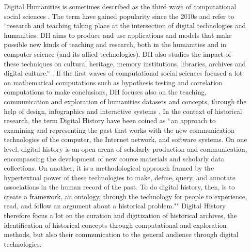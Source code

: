 Digital Humanities is sometimes described as the third wave of computational social sciences \cite{lemercierQuantitativeMethodsHumanities2019}.
The term have gained popularity since the 2010s and refer to ``research and teaching taking place at the intersection of digital technologies and humanities. DH aims to
produce and use applications and models that make possible new kinds of teaching and research, both in the humanities and
in computer science (and its allied technologies). DH also studies the impact of these techniques on cultural heritage,
memory institutions, libraries, archives and digital culture.'' \cite{terras2011quantifying}.
If the first waves of computational social sciences focused a lot on mathematical computations such as hypothesis testing and correlation computations to make conclusions, DH focuses also on the teaching, communication and exploration of humanities datasets and concepts, through the help of design, infographics and interactive systems \cite{burdickDigitalHumanities2016}.
In the context of historical research, the term Digital History have been coined as ``an approach to examining and representing the past that works with the new communication technologies of the computer, the Internet network, and software systems. On one level, digital history is an open arena of scholarly production and communication, encompassing the development of new course materials and scholarly data collections. On another, it is a methodological approach framed by the hypertextual power of these technologies to make, define, query, and annotate associations in the human record of the past. To do digital history, then, is to create a framework, an ontology, through the technology for people to experience, read, and follow an argument about a historical problem."" \cite{InterchangePromiseDigital2008}
Digital History therefore focus a lot on the curation and digitization of historical archives, the identification of historical concepts through computational and exploration methods, but also their communication to the general audience through digital technologies.

